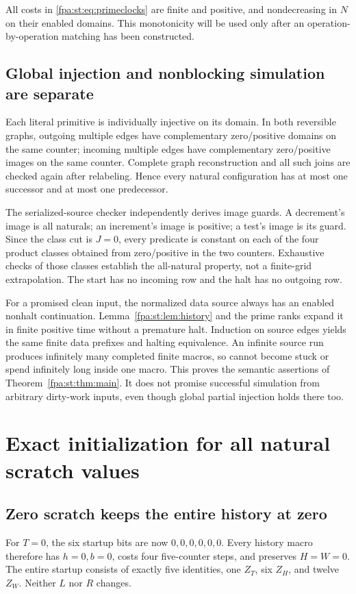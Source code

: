 \documentclass[11pt,a4paper]{article}
\numberwithin{equation}{section}
\begin{document}
All costs in \eqref{fpa:st:eq:primeclocks} are finite and positive, and
nondecreasing in $N$ on their enabled domains. This monotonicity will be used
only after an operation-by-operation matching has been constructed.

\subsection{Global injection and nonblocking simulation are separate}
Each literal primitive is individually injective on its domain. In both
reversible graphs, outgoing multiple edges have complementary zero/positive
domains on the same counter; incoming multiple edges have complementary
zero/positive images on the same counter. Complete graph reconstruction and
all such joins are checked again after relabeling. Hence every natural
configuration has at most one successor and at most one predecessor.

The serialized-source checker independently derives image guards. A
decrement's image is all naturals; an increment's image is positive; a
test's image is its guard. Since the class cut is $J=0$, every predicate is
constant on each of the four product classes obtained from zero/positive
in the two counters. Exhaustive checks of those classes establish the
all-natural property, not a finite-grid extrapolation. The start has no
incoming row and the halt has no outgoing row.

For a promised clean input, the normalized data source always has an enabled
nonhalt continuation. Lemma~\ref{fpa:st:lem:history} and the prime ranks expand
it in finite positive time without a premature halt. Induction on source
edges yields the same finite data prefixes and halting equivalence. An
infinite source run produces infinitely many completed finite macros, so
cannot become stuck or spend infinitely long inside one macro. This proves
the semantic assertions of Theorem~\ref{fpa:st:thm:main}. It does not promise
successful simulation from arbitrary dirty-work inputs, even though global
partial injection holds there too.

\section{Exact initialization for all natural scratch values}
\label{fpa:st:sec:startup}
\subsection{Zero scratch keeps the entire history at zero}
For $T=0$, the six startup bits are now $0,0,0,0,0,0$. Every history macro
therefore has $h=0,b=0$, costs four five-counter steps, and preserves
$H=W=0$. The entire startup consists of exactly five identities, one $Z_T$,
six $Z_H$, and twelve $Z_W$. Neither $L$ nor $R$ changes.
\end{document}
